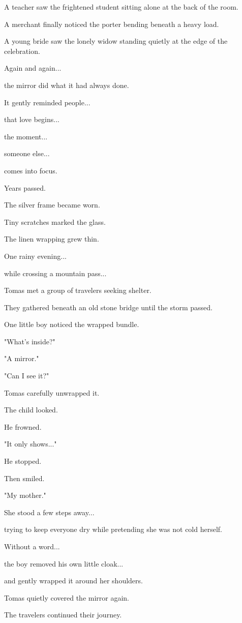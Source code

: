 \documentclass[12pt,openany]{book}
\begin{document}
A teacher saw the frightened student sitting alone at the back of the room.

A merchant finally noticed the porter bending beneath a heavy load.

A young bride saw the lonely widow standing quietly at the edge of the celebration.

Again and again...

the mirror did what it had always done.

It gently reminded people...

that love begins...

the moment...

someone else...

comes into focus.

Years passed.

The silver frame became worn.

Tiny scratches marked the glass.

The linen wrapping grew thin.

One rainy evening...

while crossing a mountain pass...

Tomas met a group of travelers seeking shelter.

They gathered beneath an old stone bridge until the storm passed.

One little boy noticed the wrapped bundle.

"What's inside?"

"A mirror."

"Can I see it?"

Tomas carefully unwrapped it.

The child looked.

He frowned.

"It only shows..."

He stopped.

Then smiled.

"My mother."

She stood a few steps away...

trying to keep everyone dry while pretending she was not cold herself.

Without a word...

the boy removed his own little cloak...

and gently wrapped it around her shoulders.

Tomas quietly covered the mirror again.

The travelers continued their journey.
\end{document}

